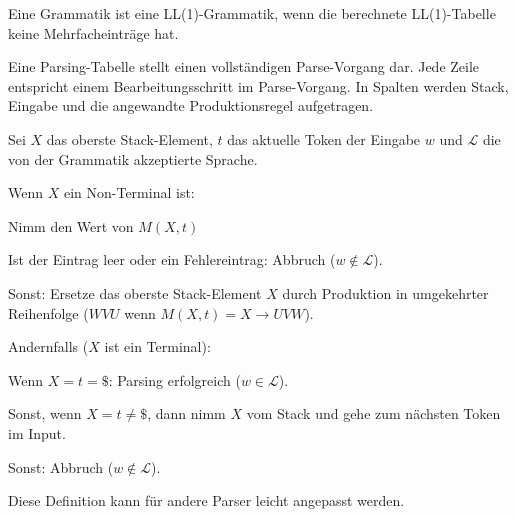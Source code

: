 \begin{defn}
Eine Grammatik ist eine LL(1)-Grammatik, wenn die berechnete LL(1)-Tabelle keine Mehrfacheinträge hat.
\end{defn}

\begin{defn}
Eine Parsing-Tabelle stellt einen vollständigen Parse-Vorgang dar.
Jede Zeile entspricht einem Bearbeitungsschritt im Parse-Vorgang.
In Spalten werden Stack, Eingabe und die angewandte Produktionsregel aufgetragen.

\begin{algo}
Sei $X$ das oberste Stack-Element, $t$ das aktuelle Token der Eingabe $w$ und $\mathcal{L}$ die von der Grammatik akzeptierte Sprache.
\begin{\whichenum}
\item Wenn $X$ ein Non-Terminal ist:
\begin{\whichenum}
\item Nimm den Wert von $M(X,t)$
\item Ist der Eintrag leer oder ein Fehlereintrag: Abbruch ($w \not \in \mathcal{L}$).
\item Sonst: Ersetze das oberste Stack-Element $X$ durch Produktion in umgekehrter Reihenfolge ($WVU$ wenn $M(X,t)=X\to UVW$).
\end{\whichenum}
\item Andernfalls ($X$ ist ein Terminal):
\begin{\whichenum}
\item Wenn $X=t=\$$: Parsing erfolgreich ($w \in \mathcal{L}$).
\item Sonst, wenn $X=t\neq\$$, dann nimm $X$ vom Stack und gehe zum nächsten Token im Input.
\item Sonst: Abbruch ($w \not \in \mathcal{L}$).
\end{\whichenum}
\end{\whichenum}
\end{algo}
\end{defn}

Diese Definition kann für andere Parser leicht angepasst werden.

